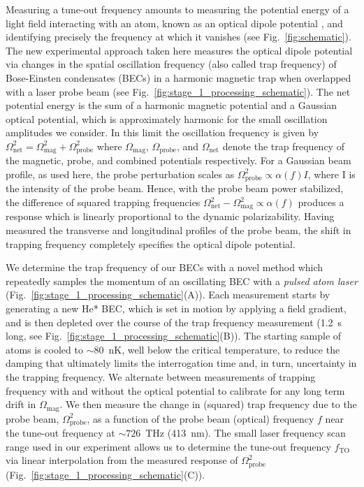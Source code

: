 \documentclass[12pt]{article}
\begin{document}
Measuring a tune-out frequency amounts to measuring the potential energy of a light field interacting with an atom, known as an optical dipole potential \cite{grimmOpticalDipoleTraps2000}, and identifying precisely the frequency at which it vanishes (see Fig.~\ref{fig:schematic}). The new experimental approach taken here measures the optical dipole potential via changes in the spatial oscillation frequency (also called trap frequency) of Bose-Einsten condensates (BECs) in a harmonic magnetic trap when overlapped with a laser probe beam (see Fig.~\ref{fig:stage_1_processing_schematic}). The net potential energy is the sum of a harmonic magnetic potential and a Gaussian optical potential, which is approximately harmonic for the small oscillation amplitudes we consider. In this limit the oscillation frequency is given by $\Omega_{\text{net}}^2=\Omega_{\text{mag}}^2+\Omega_{\text{probe}}^2$ where \(\Omega_{\text{mag}}\), \(\Omega_{\text{probe}}\), and \(\Omega_{\text{net}}\) denote the trap frequency of the magnetic, probe, and combined potentials respectively. For a Gaussian beam profile, as used here, the probe perturbation scales as \(\Omega_{\text{probe}}^2\propto \alpha(f) I\), where I is the intensity of the probe beam. Hence, with the probe beam power stabilized, the difference of squared trapping frequencies \(\Omega_{\text{net}}^2-\Omega_{\text{mag}}^2\propto\alpha(f)\) produces a response which is linearly proportional to the dynamic polarizability. Having measured the transverse and longitudinal profiles of the probe beam, the shift in trapping frequency completely specifies the optical dipole potential. 


We determine the trap frequency of our BECs with a novel method which repeatedly samples the momentum of an oscillating BEC with a \textit{pulsed atom laser} \cite{PhysRevLett.78.582,Manning:10} (Fig.~\ref{fig:stage_1_processing_schematic}(A)). Each measurement starts by generating a new He* BEC, which is set in motion by applying a field gradient, and is then depleted over the course of the trap frequency measurement (1.2~s long, see Fig.~\ref{fig:stage_1_processing_schematic}(B)). The starting sample of atoms is cooled to ${\sim}80$~nK, well below the critical temperature, to reduce the damping that ultimately limits the interrogation time and, in turn, uncertainty in the trapping frequency. We alternate between measurements of trapping frequency with and without the optical potential to calibrate for any long term drift in \(\Omega_{\text{mag}}\). We then measure the change in (squared) trap frequency due to the probe beam, \(\Omega_{\text{probe}}^2\), as a function of the probe beam (optical) frequency $f$ near the tune-out frequency at  ${\sim} 726$~THz (413~nm). The small laser frequency scan range used in our experiment allows us to determine the tune-out frequency \(f_{\text{TO}}\) via linear interpolation from the measured response of $\Omega_{\text{probe}}^2$ (Fig.~\ref{fig:stage_1_processing_schematic}(C)).
\end{document}
